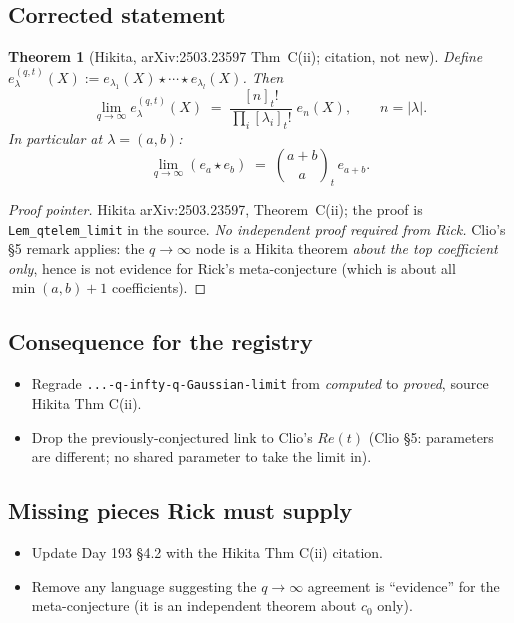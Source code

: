 \documentclass[11pt]{article}
\newtheorem{theorem}{Theorem}
\theoremstyle{definition}
\newcommand{\qi}[1]{[#1]_t}
\begin{document}
\subsection*{Corrected statement}
\begin{theorem}[Hikita, arXiv:2503.23597 Thm~C(ii); citation, not new]
\label{thm:qinfty}
Define $e_\lambda^{(q,t)}(X):=e_{\lambda_1}(X)\star\cdots\star e_{\lambda_l}(X)$.
Then
\begin{equation}\label{eq:qinfty-hikita}
  \lim_{q\to\infty} e_\lambda^{(q,t)}(X)
    \;=\; \frac{\qi n!}{\prod_i \qi{\lambda_i}!}\; e_n(X),
      \qquad n = |\lambda|.
\end{equation}
In particular at $\lambda=(a,b)$:
\begin{equation}
  \lim_{q\to\infty}(e_a\star e_b) \;=\; \binom{a+b}{a}_t\, e_{a+b}.
\end{equation}
\end{theorem}

\begin{proof}[Proof pointer]
Hikita arXiv:2503.23597, Theorem~C(ii); the proof is
\texttt{Lem\_qtelem\_limit} in the source. \emph{No independent proof
required from Rick.} Clio's \S5 remark applies: the $q\to\infty$ node
is a Hikita theorem \emph{about the top coefficient only}, hence is
not evidence for Rick's meta-conjecture (which is about all $\min(a,b)+1$
coefficients).
\end{proof}

\subsection*{Consequence for the registry}
\begin{itemize}[leftmargin=1.5em]
  \item Regrade \verb|...-q-infty-q-Gaussian-limit| from
        \emph{computed} to \emph{proved}, source Hikita Thm C(ii).
  \item Drop the previously-conjectured link to Clio's $Re(t)$
        (Clio \S5: parameters are different; no shared parameter to
        take the limit in).
\end{itemize}

\subsection*{Missing pieces Rick must supply}
\begin{itemize}[leftmargin=1.5em]
  \item Update Day 193 \S4.2 with the Hikita Thm C(ii) citation.
  \item Remove any language suggesting the $q\to\infty$ agreement is
        ``evidence'' for the meta-conjecture (it is an independent
        theorem about $c_0$ only).
\end{itemize}
\end{document}
